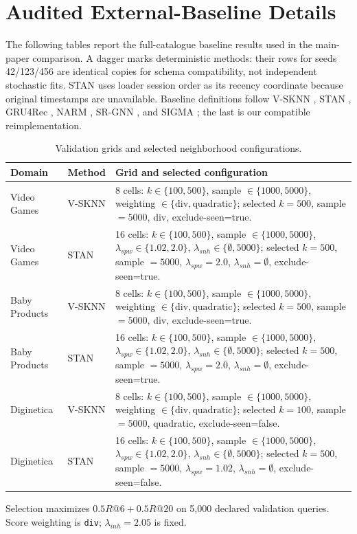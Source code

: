 \section{Audited External-Baseline Details}
\noindent The following tables report the full-catalogue baseline results used in the main-paper comparison. A dagger marks deterministic methods: their rows for seeds 42/123/456 are identical copies for schema compatibility, not independent stochastic fits.  STAN uses loader session order as its recency coordinate because original timestamps are unavailable.  Baseline definitions follow V-SKNN \cite{ludewig2018vsknn}, STAN \cite{garg2019stan}, GRU4Rec \cite{hidasi2016gru4rec}, NARM \cite{li2017narm}, SR-GNN \cite{wu2019srgnn}, and SIGMA \cite{sigma2025}; the last is our compatible reimplementation.

\begin{table}[h]
\caption{Validation grids and selected neighborhood configurations.}
\centering\scriptsize
\begin{tabular}{llp{}}
\toprule
Domain & Method & Grid and selected configuration\\
\midrule
Video Games & V-SKNN & 8 cells: $k\in\{100,500\}$, sample $\in\{1000,5000\}$, weighting $\in\{\mathrm{div},\mathrm{quadratic}\}$; selected $k=500$, sample $=5000$, div, exclude-seen=true.\\
Video Games & STAN & 16 cells: $k\in\{100,500\}$, sample $\in\{1000,5000\}$, $\lambda_{spw}\in\{1.02,2.0\}$, $\lambda_{snh}\in\{\emptyset,5000\}$; selected $k=500$, sample $=5000$, $\lambda_{spw}=2.0$, $\lambda_{snh}=\emptyset$, exclude-seen=true.\\
Baby Products & V-SKNN & 8 cells: $k\in\{100,500\}$, sample $\in\{1000,5000\}$, weighting $\in\{\mathrm{div},\mathrm{quadratic}\}$; selected $k=500$, sample $=5000$, div, exclude-seen=true.\\
Baby Products & STAN & 16 cells: $k\in\{100,500\}$, sample $\in\{1000,5000\}$, $\lambda_{spw}\in\{1.02,2.0\}$, $\lambda_{snh}\in\{\emptyset,5000\}$; selected $k=500$, sample $=5000$, $\lambda_{spw}=2.0$, $\lambda_{snh}=\emptyset$, exclude-seen=true.\\
Diginetica & V-SKNN & 8 cells: $k\in\{100,500\}$, sample $\in\{1000,5000\}$, weighting $\in\{\mathrm{div},\mathrm{quadratic}\}$; selected $k=100$, sample $=5000$, quadratic, exclude-seen=false.\\
Diginetica & STAN & 16 cells: $k\in\{100,500\}$, sample $\in\{1000,5000\}$, $\lambda_{spw}\in\{1.02,2.0\}$, $\lambda_{snh}\in\{\emptyset,5000\}$; selected $k=500$, sample $=5000$, $\lambda_{spw}=1.02$, $\lambda_{snh}=\emptyset$, exclude-seen=false.\\
\bottomrule
\end{tabular}
\par\smallskip\scriptsize Selection maximizes $0.5R@6+0.5R@20$ on 5,000 declared validation queries. Score weighting is \texttt{div}; $\lambda_{inh}=2.05$ is fixed.
\end{table}

